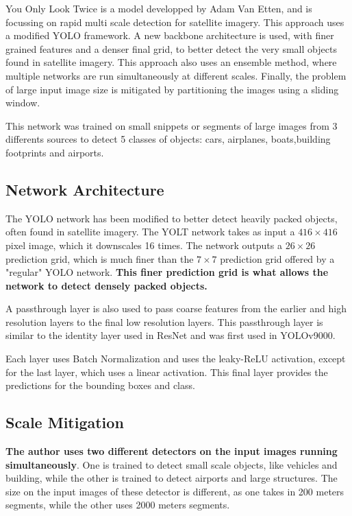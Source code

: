 
You Only Look Twice is a model developped by Adam Van Etten, and is focussing on rapid multi scale detection for satellite imagery. This approach uses a modified YOLO\cite{yolov3} framework. A new backbone architecture is used, with finer grained features and a denser final grid, to better detect the very small objects found in satellite imagery. This approach also uses an ensemble method, where multiple networks are run simultaneously at different scales. Finally, the problem of large input image size is mitigated by partitioning the images using a sliding window.

This network was trained on small snippets or segments of large images from 3 differents sources to detect 5 classes of objects: cars, airplanes, boats,building footprints and airports.
\subsection{Network Architecture}
The YOLO network has been modified to better detect heavily packed objects, often found in satellite imagery. The YOLT network takes as input a $416 \times 416$ pixel image, which it downscales 16 times. The network outputs a $26 \times 26$ prediction grid, which is much finer than the $7 \times 7$ prediction grid offered by a "regular" YOLO network. \textbf{This finer prediction grid is what allows the network to detect densely packed objects.}


A passthrough layer is also used to pass coarse features from the earlier and high resolution layers to the final low resolution layers. This passthrough layer is similar to the identity layer used in ResNet\cite{resNet} and was first used in YOLOv9000\cite{yolov9000}.
 
Each layer uses Batch Normalization\cite{batchNorm} and uses the leaky-ReLU activation\cite{leakyRelu}, except for the last layer, which uses a linear activation. This final layer provides the predictions for the bounding boxes and class.

\subsection{Scale Mitigation}
\textbf{The author uses two different detectors on the input images running simultaneously}. One is trained to detect small scale objects, like vehicles and building, while the other is trained to detect airports and large structures. The size on the input images of these detector is different, as one takes in 200 meters segments, while the other uses 2000 meters segments. 

